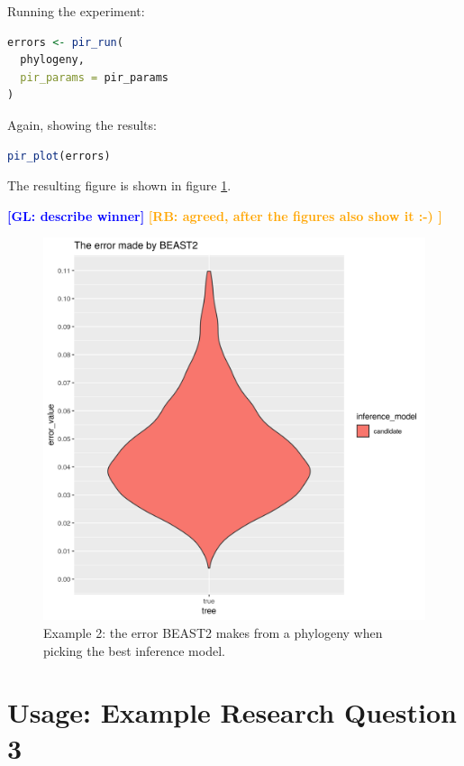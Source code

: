 \documentclass{article}
\newcommand{\giovanni}[1]{\textcolor{blue}{\textbf{[GL: #1]}}}
\newcommand{\richel}[1]{\textcolor{orange}{\textbf{[RB: #1]}}}
\begin{document}
Running the experiment:

\begin{lstlisting}[language=R, floatplacement=ht, frame=single]
errors <- pir_run(
  phylogeny,
  pir_params = pir_params
)
\end{lstlisting}

Again, showing the results:

\begin{lstlisting}[language=R, floatplacement=ht, frame=single]
pir_plot(errors)
\end{lstlisting}

The resulting figure is shown in figure \ref{fig:example_2}.

\giovanni{describe winner}
\richel{agreed, after the figures also show it :-) }

\begin{figure}[ht]
  \includegraphics[width=\textwidth]{example_2_errors.png}
  \caption{
    Example 2: the error BEAST2 makes from a phylogeny when
    picking the best inference model.
  }
  \label{fig:example_2}
\end{figure}

\section{Usage: Example Research Question 3}
\end{document}
